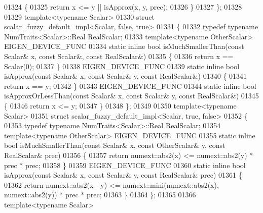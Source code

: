 \begin{DoxyCode}
01324   \{
01325     \textcolor{keywordflow}{return} x <= y || isApprox(x, y, prec);
01326   \}
01327 \};
01328 
01329 \textcolor{keyword}{template}<\textcolor{keyword}{typename} Scalar>
01330 \textcolor{keyword}{struct }scalar\_fuzzy\_default\_impl<Scalar, false, true>
01331 \{
01332   \textcolor{keyword}{typedef} \textcolor{keyword}{typename} NumTraits<Scalar>::Real RealScalar;
01333   \textcolor{keyword}{template}<\textcolor{keyword}{typename} OtherScalar> EIGEN\_DEVICE\_FUNC
01334   \textcolor{keyword}{static} \textcolor{keyword}{inline} \textcolor{keywordtype}{bool} isMuchSmallerThan(\textcolor{keyword}{const} Scalar& x, \textcolor{keyword}{const} Scalar&, \textcolor{keyword}{const} RealScalar&)
01335   \{
01336     \textcolor{keywordflow}{return} x == Scalar(0);
01337   \}
01338   EIGEN\_DEVICE\_FUNC
01339   \textcolor{keyword}{static} \textcolor{keyword}{inline} \textcolor{keywordtype}{bool} isApprox(\textcolor{keyword}{const} Scalar& x, \textcolor{keyword}{const} Scalar& y, \textcolor{keyword}{const} RealScalar&)
01340   \{
01341     \textcolor{keywordflow}{return} x == y;
01342   \}
01343   EIGEN\_DEVICE\_FUNC
01344   \textcolor{keyword}{static} \textcolor{keyword}{inline} \textcolor{keywordtype}{bool} isApproxOrLessThan(\textcolor{keyword}{const} Scalar& x, \textcolor{keyword}{const} Scalar& y, \textcolor{keyword}{const} RealScalar&)
01345   \{
01346     \textcolor{keywordflow}{return} x <= y;
01347   \}
01348 \};
01349 
01350 \textcolor{keyword}{template}<\textcolor{keyword}{typename} Scalar>
01351 \textcolor{keyword}{struct }scalar\_fuzzy\_default\_impl<Scalar, true, false>
01352 \{
01353   \textcolor{keyword}{typedef} \textcolor{keyword}{typename} NumTraits<Scalar>::Real RealScalar;
01354   \textcolor{keyword}{template}<\textcolor{keyword}{typename} OtherScalar> EIGEN\_DEVICE\_FUNC
01355   \textcolor{keyword}{static} \textcolor{keyword}{inline} \textcolor{keywordtype}{bool} isMuchSmallerThan(\textcolor{keyword}{const} Scalar& x, \textcolor{keyword}{const} OtherScalar& y, \textcolor{keyword}{const} RealScalar& prec)
01356   \{
01357     \textcolor{keywordflow}{return} numext::abs2(x) <= numext::abs2(y) * prec * prec;
01358   \}
01359   EIGEN\_DEVICE\_FUNC
01360   \textcolor{keyword}{static} \textcolor{keyword}{inline} \textcolor{keywordtype}{bool} isApprox(\textcolor{keyword}{const} Scalar& x, \textcolor{keyword}{const} Scalar& y, \textcolor{keyword}{const} RealScalar& prec)
01361   \{
01362     \textcolor{keywordflow}{return} numext::abs2(x - y) <= numext::mini(numext::abs2(x), numext::abs2(y)) * prec * prec;
01363   \}
01364 \};
01365 
01366 \textcolor{keyword}{template}<\textcolor{keyword}{typename} Scalar>

\end{DoxyCode}
